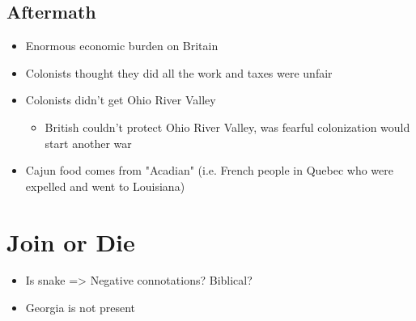 \documentclass[letterpaper]{article}
\begin{document}
\subsection{Aftermath}
\label{sec:orgae79566}
\begin{itemize}
\item Enormous economic burden on Britain
\item Colonists thought they did all the work and taxes were unfair
\item Colonists didn't get Ohio River Valley
\begin{itemize}
\item British couldn't protect Ohio River Valley, was fearful colonization would start another war
\end{itemize}
\item Cajun food comes from "Acadian" (i.e. French people in Quebec who were expelled and went to Louisiana)
\end{itemize}
\section{Join or Die}
\label{sec:orgd2712f9}
\begin{itemize}
\item Is snake => Negative connotations? Biblical?
\item Georgia is not present
\end{itemize}
\end{document}
